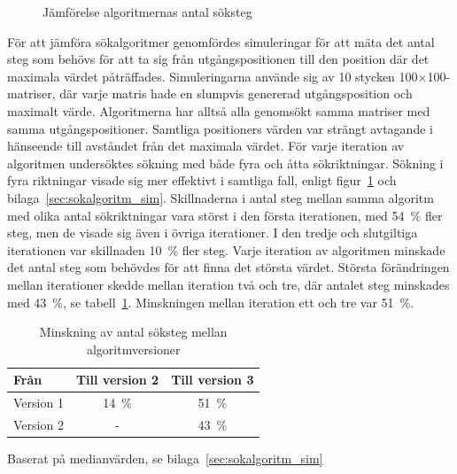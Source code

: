             \begin{figure}[b]
                
            \caption{\label{fig:algoritm_steg} Jämförelse algoritmernas antal söksteg}
            \end{figure} 

            För att jämföra sökalgoritmer genomfördes simuleringar för att mäta det antal steg som behövs för att ta sig från utgångspositionen till den position där det maximala värdet påträffades. Simuleringarna använde sig av 10 stycken 100$\times$100-matriser, där varje matris hade en slumpvis genererad utgångsposition och maximalt värde. Algoritmerna har alltså alla genomsökt samma matriser med samma utgångspositioner. Samtliga positioners värden var strängt avtagande i hänseende till avståndet från det maximala värdet. För varje iteration av algoritmen undersöktes sökning med både fyra och åtta sökriktningar. Sökning i fyra riktningar visade sig mer effektivt i samtliga fall, enligt figur~\ref{fig:algoritm_steg} och bilaga~\ref{sec:sokalgoritm_sim}. Skillnaderna i antal steg mellan samma algoritm med olika antal sökriktningar vara störst i den första iterationen, med 54~\% fler steg, men de visade sig även i övriga iterationer. I den tredje och slutgiltiga iterationen var skillnaden 10~\% fler steg. Varje iteration av algoritmen minskade det antal steg som behövdes för att finna det största värdet. Största förändringen mellan iterationer skedde mellan iteration två och tre, där antalet steg minskades med 43~\%, se tabell~\ref{tab:algoritm_forbattring}. Minskningen mellan iteration ett och tre var 51~\%. \bigskip

            \begin{table}
                \caption{\label{tab:algoritm_forbattring}Minskning av antal söksteg mellan algoritmversioner}
                \centering
                \begin{threeparttable}
                \begin{tabular}{@{}lcc@{}}
                \toprule
                Från        & \multicolumn{1}{l}{Till version 2} & \multicolumn{1}{l}{Till version 3} \\ \midrule
                Version 1 & 14~\%                                & 51~\%                                \\
                Version 2 & -                                    & 43~\% \\ \bottomrule
                \end{tabular}
                \begin{tablenotes}
                \item Baserat på medianvärden, se bilaga~\ref{sec:sokalgoritm_sim}
            \end{tablenotes}
            \end{threeparttable}
            \end{table}

